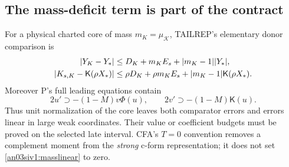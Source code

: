 \documentclass[11pt]{article}
\numberwithin{equation}{section}
\theoremstyle{remark}\newtheorem{remark}[proposition]{Remark}
\newcommand{\KK}{\mathcal K}\newcommand{\BB}{\mathcal B}
\newcommand{\Kfun}{\mathsf K}\newcommand{\Ffun}{\mathsf F}
\begin{document}
\subsection*{The mass-deficit term is part of the contract}
For a physical charted core of mass $m_K=\mu_{\KK}$, TAILREP's
elementary donor comparison is
\begin{align}
 |Y_K-Y_*|&\le D_K+m_KE_s+|m_K-1||Y_*|,\notag\\
 |K_{s,K}-\Kfun(\rho X_*)|
 &\le\rho D_K+\rho m_KE_s+|m_K-1|\Kfun(\rho X_*).
 \label{an03siv1:massdeficit}
\end{align}
Moreover P's full leading equations contain
\begin{equation}
 2u'\supset-(1-M)v\Phi(u),\qquad
 2v'\supset-(1-M)\Kfun(u).
 \label{an03siv1:masslinear}
\end{equation}
Thus unit normalization of the core leaves both comparator errors
and errors linear in large weak coordinates. Their value or coefficient
budgets must be proved on the selected late interval. CFA's
$T=0$ convention removes a complement moment from the \emph{strong}
c-form representation; it does not set \eqref{an03siv1:masslinear}
to zero.
\end{document}
